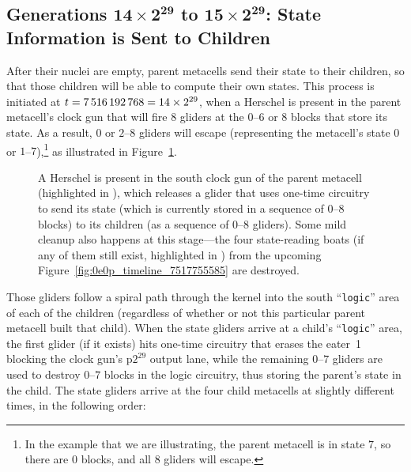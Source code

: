 

\subsection{Generations $\mathbf{14 \times 2^{29}}$ to $\mathbf{15 \times 2^{29}}$: State Information is Sent to Children}\label{sec:0e0p_timeline_state}

After their nuclei are empty, parent metacells send their state to their children, so that those children will be able to compute their own states. This process is initiated at $t = 7{\,}516{\,}192{\,}768 = 14 \times 2^{29}$, when a Herschel is present in the parent metacell's clock gun that will fire $8$ gliders at the $0$--$6$ or $8$ blocks that store its state. As a result, $0$ or $2$--$8$ gliders will escape (representing the metacell's state $0$ or $1$--$7$),\footnote{In the example that we are illustrating, the parent metacell is in state $7$, so there are $0$ blocks, and all $8$ gliders will escape.} as illustrated in Figure~\ref{fig:0e0p_timeline_7516192768}.

\begin{figure}[!htb]
	\centering
	\caption{A Herschel is present in the south clock gun of the parent metacell (highlighted in ), which releases a glider that uses one-time circuitry to send its state (which is currently stored in a sequence of $0$--$8$ blocks) to its children (as a sequence of $0$--$8$ gliders). Some mild cleanup also happens at this stage---the four state-reading boats (if any of them still exist, highlighted in ) from the upcoming Figure~\ref{fig:0e0p_timeline_7517755585} are destroyed.}
	\label{fig:0e0p_timeline_7516192768}
\end{figure}

Those gliders follow a spiral path through the kernel into the south ``\texttt{logic}'' area of each of the children (regardless of whether or not this particular parent metacell built that child). When the state gliders arrive at a child's ``\texttt{logic}'' area, the first glider (if it exists) hits one-time circuitry that erases the eater~1 blocking the clock gun's p$2^{29}$ output lane, while the remaining $0$--$7$ gliders are used to destroy $0$--$7$ blocks in the logic circuitry, thus storing the parent's state in the child. The state gliders arrive at the four child metacells at slightly different times, in the following order:\smallskip

